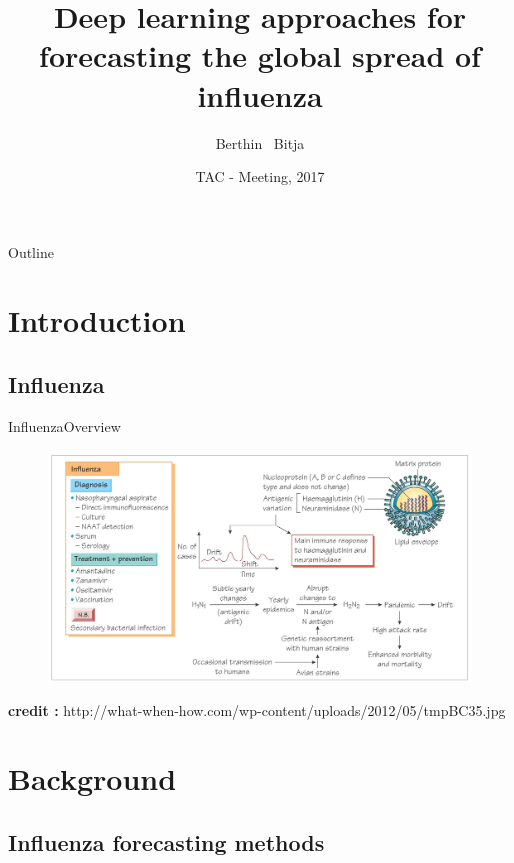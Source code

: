 \documentclass{beamer}
\title{Deep learning approaches for forecasting the global spread of influenza}
\author{Berthin ~Bitja\inst{1}}
\institute[Universities of Ottawa] %
{
  \inst{1}%
  Supervisor : Prof. Stephane Arris-Brossou \\
  Department of Biology\\
  University of Ottawa
}
\date{TAC - Meeting, 2017}
\begin{document}
\begin{frame}
  \titlepage
\end{frame}

\begin{frame}{Outline}
  \tableofcontents
\end{frame}

\section{Introduction}
\subsection*{Influenza}

\begin{frame}{Influenza}{Overview}
\begin{figure}[h]
    \centering
    \includegraphics[width=\textwidth]{influenza.jpg}

\end{figure}

{\tiny \textbf{credit :} http://what-when-how.com/wp-content/uploads/2012/05/tmpBC35.jpg \par}
\end{frame}

\section{Background}
\subsection*{Influenza forecasting methods}
\end{document}
